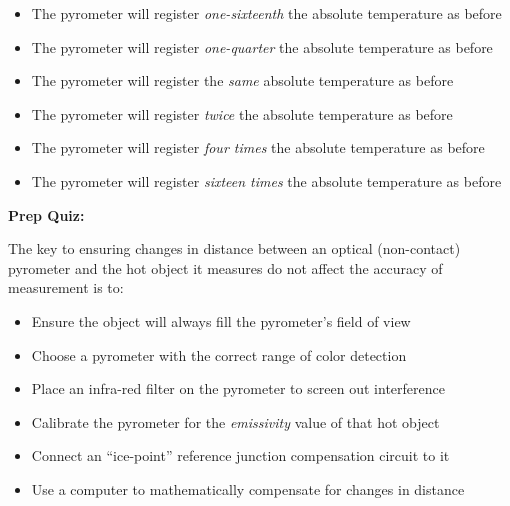 \begin{itemize}
\item{} The pyrometer will register {\it one-sixteenth} the absolute temperature as before 
\vskip 5pt 
\item{} The pyrometer will register {\it one-quarter} the absolute temperature as before
\vskip 5pt 
\item{} The pyrometer will register the {\it same} absolute temperature as before 
\vskip 5pt 
\item{} The pyrometer will register {\it twice} the absolute temperature as before 
\vskip 5pt 
\item{} The pyrometer will register {\it four times} the absolute temperature as before 
\vskip 5pt 
\item{} The pyrometer will register {\it sixteen times} the absolute temperature as before 
\end{itemize}

\vfil \eject

\noindent
{\bf Prep Quiz:}

The key to ensuring changes in distance between an optical (non-contact) pyrometer and the hot object it measures do not affect the accuracy of measurement is to:

\begin{itemize}
\item{} Ensure the object will always fill the pyrometer's field of view
\vskip 5pt 
\item{} Choose a pyrometer with the correct range of color detection 
\vskip 5pt 
\item{} Place an infra-red filter on the pyrometer to screen out interference
\vskip 5pt 
\item{} Calibrate the pyrometer for the {\it emissivity} value of that hot object
\vskip 5pt 
\item{} Connect an ``ice-point'' reference junction compensation circuit to it
\vskip 5pt 
\item{} Use a computer to mathematically compensate for changes in distance
\end{itemize}





